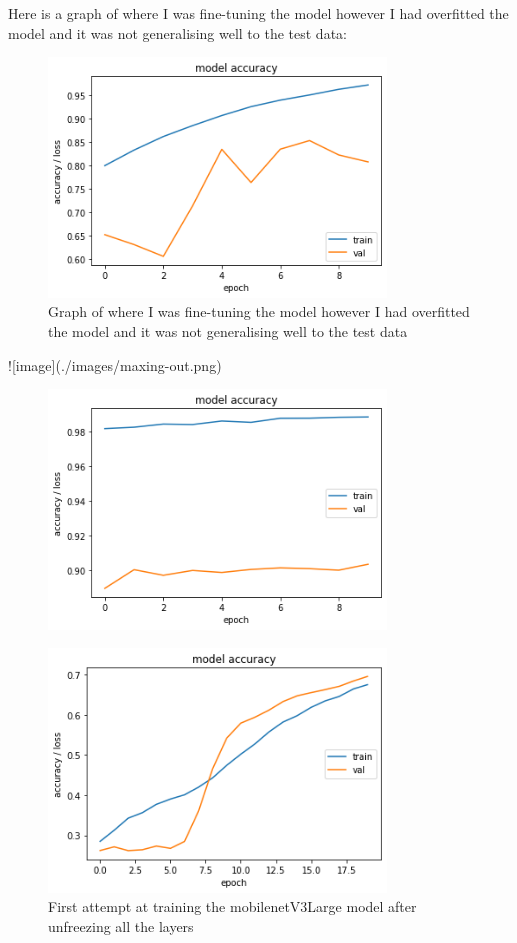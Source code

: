 \documentclass[]{final_report}
\begin{document}
Here is a graph of where I was fine-tuning the model however I had overfitted the model and it was not generalising well to the test data:

\begin{figure}[ht!]
  \centering
  \includegraphics[width=0.8\textwidth]{images/fine-tuning-more.png}
  \caption{Graph of where I was fine-tuning the model however I had overfitted the model and it was not generalising well to the test data}
\end{figure}

![image](./images/maxing-out.png)
\begin{figure}[ht!]
  \centering
  \includegraphics[width=0.8\textwidth]{images/maxing-out.png}
\end{figure}


\begin{figure}[ht!]
  \centering
  \includegraphics[width=0.8\textwidth]{images/mobilenetv3-first-attempt.png}
  \caption{First attempt at training the mobilenetV3Large model after unfreezing all the layers}
\end{figure}
\end{document}
